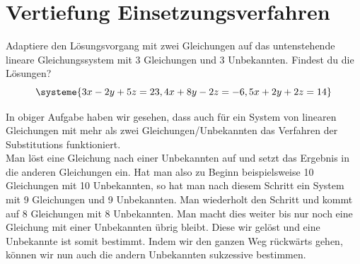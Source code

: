 \documentclass[11pt,oneside]{article}
\begin{document}
\section*{Vertiefung Einsetzungsverfahren}
	\begin{aufgabe}
		Adaptiere den Lösungsvorgang mit zwei Gleichungen auf das untenstehende lineare Gleichungssystem mit 3 Gleichungen und 3 Unbekannten. Findest du die Lösungen?
		\begin{equation*}
			\systeme{3x-2y+5z=23, 4x+8y-2z=-6, 5x+2y+2z=14}
		\end{equation*}
	\end{aufgabe}
	In obiger Aufgabe haben wir gesehen, dass auch für ein System von linearen Gleichungen mit mehr als zwei Gleichungen/Unbekannten das Verfahren der Substitutions funktioniert.\\
	Man löst eine Gleichung nach einer Unbekannten auf und setzt das Ergebnis in die anderen Gleichungen ein. Hat man also zu Beginn beispielsweise 10 Gleichungen mit 10 Unbekannten, so hat man nach diesem Schritt ein System mit 9 Gleichungen und 9 Unbekannten. Man wiederholt den Schritt und kommt auf 8 Gleichungen mit 8 Unbekannten. Man macht dies weiter bis nur noch eine Gleichung mit einer Unbekannten übrig bleibt. Diese wir gelöst und eine Unbekannte ist somit bestimmt. Indem wir den ganzen Weg rückwärts gehen, können wir nun auch die andern Unbekannten sukzessive bestimmen.
\end{document}
